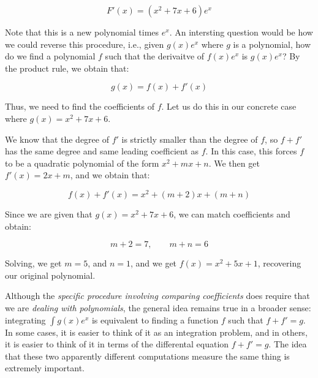 \documentclass[10pt]{amsart}
\begin{document}
$$F'(x) = (x^2 + 7x + 6)e^x$$

Note that this is a new polynomial times $e^x$. An intersting question
would be how we could reverse this procedure, i.e., given $g(x)e^x$
where $g$ is a polynomial, how do we find a polynomial $f$ such that
the derivaitve of $f(x)e^x$ is $g(x)e^x$? By the product rule, we
obtain that:

$$g(x) = f(x) + f'(x)$$

Thus, we need to find the coefficients of $f$. Let us do this in our
concrete case where $g(x) = x^2 + 7x + 6$.

We know that the degree of $f'$ is strictly smaller than the degree of
$f$, so $f + f'$ has the same degree and same leading coefficient as
$f$. In this case, this forces $f$ to be a quadratic polynomial of the
form $x^2 + mx + n$. We then get $f'(x) = 2x + m$, and we obtain that:

$$f(x) + f'(x) = x^2 + (m + 2)x + (m + n)$$

Since we are given that $g(x) = x^2 + 7x + 6$, we can match
coefficients and obtain:

$$m + 2 = 7, \qquad m + n = 6$$

Solving, we get $m = 5$, and $n = 1$, and we get $f(x) = x^2 + 5x +
1$, recovering our original polynomial.

Although the {\em specific procedure involving comparing coefficients}
does require that we are {\em dealing with polynomials}, the general
idea remains true in a broader sense: integrating $\int g(x)e^x$ is
equivalent to finding a function $f$ such that $f + f' = g$. In some
cases, it is easier to think of it as an integration problem, and in
others, it is easier to think of it in terms of the differental
equation $f + f' = g$. The idea that these two apparently different
computations measure the same thing is extremely important.
\end{document}
